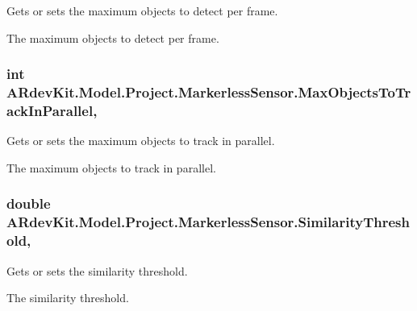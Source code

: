 Gets or sets the maximum objects to detect per frame. 

The maximum objects to detect per frame. \hypertarget{class_a_rdev_kit_1_1_model_1_1_project_1_1_markerless_sensor_ac88579a60d45b1d6df015f5e7fd39520}{
\subsubsection[{Max\-Objects\-To\-Track\-In\-Parallel}]{\setlength{\rightskip}{0pt plus 5cm}int A\-Rdev\-Kit.\-Model.\-Project.\-Markerless\-Sensor.\-Max\-Objects\-To\-Track\-In\-Parallel\hspace{0.3cm}{\ttfamily [get]}, {\ttfamily [set]}}}\label{class_a_rdev_kit_1_1_model_1_1_project_1_1_markerless_sensor_ac88579a60d45b1d6df015f5e7fd39520}


Gets or sets the maximum objects to track in parallel. 

The maximum objects to track in parallel. \hypertarget{class_a_rdev_kit_1_1_model_1_1_project_1_1_markerless_sensor_ae4442307a3d64a66c605624a2341aaa2}{
\subsubsection[{Similarity\-Threshold}]{\setlength{\rightskip}{0pt plus 5cm}double A\-Rdev\-Kit.\-Model.\-Project.\-Markerless\-Sensor.\-Similarity\-Threshold\hspace{0.3cm}{\ttfamily [get]}, {\ttfamily [set]}}}\label{class_a_rdev_kit_1_1_model_1_1_project_1_1_markerless_sensor_ae4442307a3d64a66c605624a2341aaa2}


Gets or sets the similarity threshold. 

The similarity threshold. 